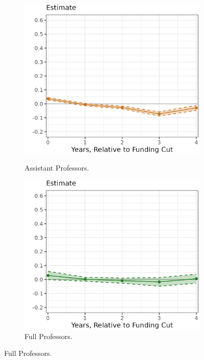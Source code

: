 \begin{figure}[H]
\begin{subfigure}[b]{0.495\textwidth}
        \label{fig:promoted-lecturer-illinois-lp-rolling}
    \end{subfigure}
    \begin{subfigure}[b]{0.495\textwidth}
        \centering
        \caption{Assistant Professors.}
        \includegraphics[width=\textwidth]{figures/promoted-assistant-illinois-lp-rolling.png}
        \label{fig:promoted-assistant-illinois-lp-rolling}
    \end{subfigure}
    \begin{subfigure}[b]{0.495\textwidth}
        \centering
        \caption{Full Professors.}
        \includegraphics[width=\textwidth]{figures/promoted-full-illinois-lp-rolling.png}

\end{subfigure}
\end{figure}

